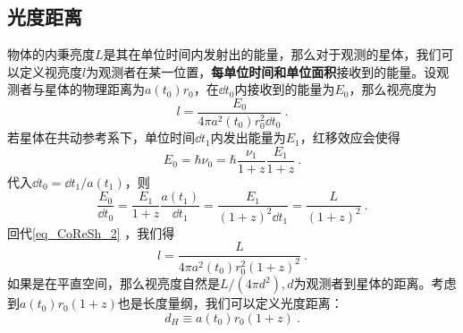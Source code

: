 \subsection{光度距离}
物体的内秉亮度$L$是其在单位时间内发射出的能量，那么对于观测的星体，我们可以定义视亮度$l$为观测者在某一位置，\textbf{每单位时间和单位面积}接收到的能量。设观测者与星体的物理距离为$a(t_0)r_0$，在$\dd t_0$内接收到的能量为$E_0$，那么视亮度为
\begin{equation}\label{eq_CoReSh_2}
l=\frac{E_0}{4\pi a^2(t_0)r_0^2\dd t_0}~.
\end{equation}
若星体在共动参考系下，单位时间$\dd t_1$内发出能量为$E_1$，红移效应会使得
\begin{equation}
E_0=\hbar\nu_0=\hbar \frac{\nu_1}{1+z}\frac{E_1}{1+z}~.
\end{equation}
代入$\dd t_0=\dd t_1/a(t_1)$，则
\begin{equation}
\frac{E_0}{\dd t_0}=\frac{E_1}{1+z}\frac{a(t_1)}{\dd t_1}=\frac{E_1}{(1+z)^2\dd t_1}=\frac{L}{(1+z)^2}~.
\end{equation}
回代\autoref{eq_CoReSh_2} ，我们得
\begin{equation}
l=\frac{L}{4\pi a^2(t_0)r_0^2(1+z)^2}~.
\end{equation}
如果是在平直空间，那么视亮度自然是$L/(4\pi d^2),d$为观测者到星体的距离。考虑到$a(t_0)r_0(1+z)$也是长度量纲，我们可以定义光度距离：
\begin{equation}
d_H\equiv a(t_0)r_0(1+z)~.
\end{equation}